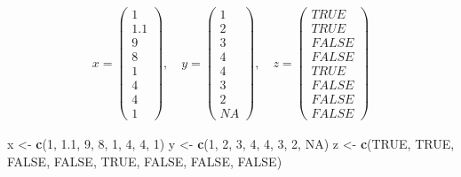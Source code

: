 \documentclass[]{article}
\newenvironment{Shaded}{\begin{snugshade}}{\end{snugshade}}
\newcommand{\KeywordTok}[1]{\textcolor[rgb]{0.13,0.29,0.53}{\textbf{#1}}}
\newcommand{\DecValTok}[1]{\textcolor[rgb]{0.00,0.00,0.81}{#1}}
\newcommand{\FloatTok}[1]{\textcolor[rgb]{0.00,0.00,0.81}{#1}}
\newcommand{\StringTok}[1]{\textcolor[rgb]{0.31,0.60,0.02}{#1}}
\newcommand{\OtherTok}[1]{\textcolor[rgb]{0.56,0.35,0.01}{#1}}
\newcommand{\NormalTok}[1]{#1}
\begin{document}
\begin{align*}
x=\left( 
\begin{array}{c}
1 \\ 
1.1 \\ 
9 \\ 
8 \\ 
1 \\ 
4 \\ 
4 \\ 
1
\end{array}
\right) ,\quad y=\left( 
\begin{array}{c}
1 \\ 
2 \\ 
3 \\ 
4 \\ 
4 \\ 
3 \\ 
2 \\ 
NA
\end{array}
\right) ,\quad z=\left( 
\begin{array}{c}
TRUE \\ 
TRUE \\ 
FALSE \\ 
FALSE \\ 
TRUE \\ 
FALSE \\ 
FALSE \\ 
FALSE
\end{array}
\right)
\end{align*}

\begin{Shaded}
\begin{Highlighting}[]
\NormalTok{x <-}\StringTok{ }\KeywordTok{c}\NormalTok{(}\DecValTok{1}\NormalTok{, }\FloatTok{1.1}\NormalTok{, }\DecValTok{9}\NormalTok{, }\DecValTok{8}\NormalTok{, }\DecValTok{1}\NormalTok{, }\DecValTok{4}\NormalTok{, }\DecValTok{4}\NormalTok{, }\DecValTok{1}\NormalTok{)}
\NormalTok{y <-}\StringTok{ }\KeywordTok{c}\NormalTok{(}\DecValTok{1}\NormalTok{, }\DecValTok{2}\NormalTok{, }\DecValTok{3}\NormalTok{, }\DecValTok{4}\NormalTok{, }\DecValTok{4}\NormalTok{, }\DecValTok{3}\NormalTok{, }\DecValTok{2}\NormalTok{, }\OtherTok{NA}\NormalTok{)}
\NormalTok{z <-}\StringTok{ }\KeywordTok{c}\NormalTok{(}\OtherTok{TRUE}\NormalTok{, }\OtherTok{TRUE}\NormalTok{, }\OtherTok{FALSE}\NormalTok{, }\OtherTok{FALSE}\NormalTok{, }\OtherTok{TRUE}\NormalTok{, }\OtherTok{FALSE}\NormalTok{, }\OtherTok{FALSE}\NormalTok{, }\OtherTok{FALSE}\NormalTok{)}
\end{Highlighting}
\end{Shaded}
\end{document}
